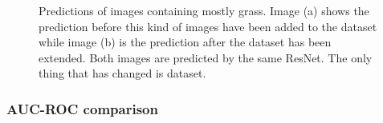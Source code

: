 \begin{figure}[!h]
	\begin{center}
		\quad
	\end{center}
	\caption[Predictions of images containing mostly grass]{Predictions of images containing mostly grass. Image (a) shows the prediction before this kind of images have been added to the dataset
	while image (b) is the prediction after the dataset has been extended. Both images
	are predicted by the same ResNet. The only thing that has changed is dataset.}
	\label{img:beforeafterextending}
\end{figure}


\subsubsection{AUC-ROC comparison}
\label{sec:first_results:convnets:aucroc}

